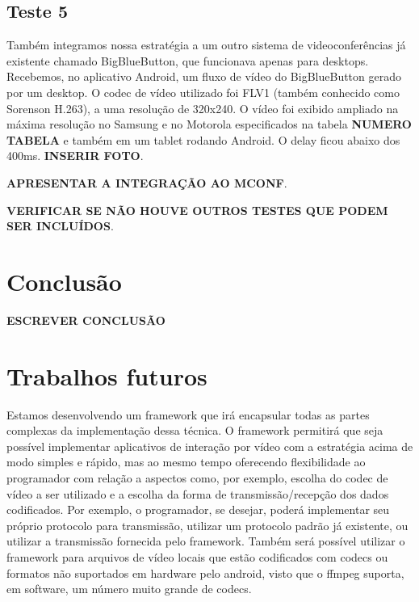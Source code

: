 \documentclass{acm_proc_article-sp}
\newcommand{\todo}[1]{\textcolor[rgb]{1.00,0.00,0.00}{\bf \uppercase{#1}}}
\begin{document}
\subsection{Teste 5}
Também integramos nossa estratégia a um outro sistema de videoconferências já existente chamado BigBlueButton, que funcionava apenas para desktops. Recebemos, no aplicativo Android, um fluxo de vídeo do BigBlueButton gerado por um desktop. O codec de vídeo utilizado foi FLV1 (também conhecido como Sorenson H.263), a uma resolução de 320x240. O vídeo foi exibido ampliado na máxima resolução no Samsung e no Motorola especificados na tabela \todo{numero tabela} e também em um tablet rodando Android. O delay ficou abaixo dos 400ms. \todo{inserir foto}.

\todo{Apresentar a integração ao mconf}.

\todo{Verificar se não houve outros testes que podem ser incluídos}.

\section{Conclusão}

\todo{escrever conclusão}

\section{Trabalhos futuros}

Estamos desenvolvendo um framework que irá encapsular todas as partes complexas da implementação dessa técnica. O framework permitirá que seja possível implementar aplicativos de interação por vídeo com a estratégia acima de modo simples e rápido, mas ao mesmo tempo oferecendo flexibilidade ao programador com relação a aspectos como, por exemplo, escolha do codec de vídeo a ser utilizado e a escolha da forma de transmissão/recepção dos dados codificados. Por exemplo, o programador, se desejar, poderá implementar seu próprio protocolo para transmissão, utilizar um protocolo padrão já existente, ou utilizar a transmissão fornecida pelo framework. Também será possível utilizar o framework para arquivos de vídeo locais que estão codificados com codecs ou formatos não suportados em hardware pelo android, visto que o ffmpeg suporta, em software, um número muito grande de codecs.

%

%
%
\balancecolumns
\end{document}
